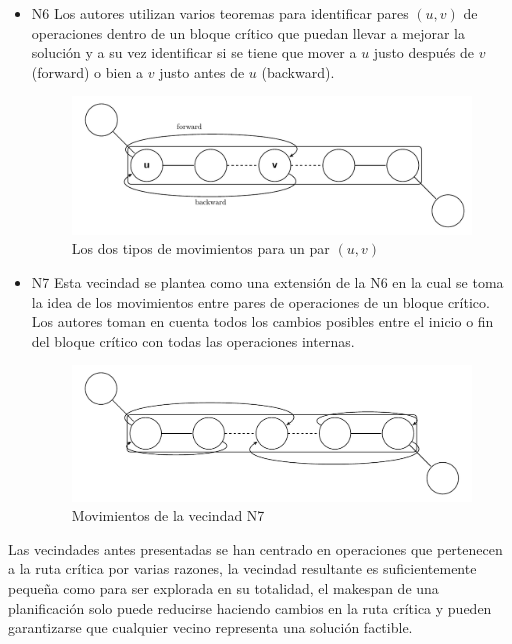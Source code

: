 \begin{itemize}
\item N6 \cite{Balas1998} Los autores utilizan varios teoremas para identificar pares $(u,v)$ de operaciones dentro de un bloque crítico que puedan llevar a mejorar la solución y a su vez identificar si se tiene que mover a $u$ justo después de $v$(forward) o bien a $v$ justo antes de $u$ (backward).
\begin{figure}[H]
\centering
\includegraphics[scale=.7]{Imagenes/N6.pdf}
\caption{Los dos tipos de movimientos para un par $(u,v)$}
\end{figure}

\item N7 \cite{Zhang2007} Esta vecindad se plantea como una extensión de la N6 en la cual se toma la idea de los movimientos entre pares de operaciones de un bloque crítico. Los autores toman en cuenta todos los cambios posibles entre el inicio o fin del bloque crítico con todas las operaciones internas.

\begin{figure}[H]
\centering
\includegraphics[scale=.7]{Imagenes/N7.pdf}
\caption{Movimientos de la vecindad N7}
\end{figure}
\end{itemize}

Las vecindades antes presentadas se han centrado en operaciones que pertenecen a la ruta crítica por varias razones, la vecindad resultante es suficientemente pequeña como para ser explorada en su totalidad, el makespan de una planificación solo puede reducirse haciendo cambios en la ruta crítica y pueden garantizarse que cualquier vecino representa una solución factible.\\

